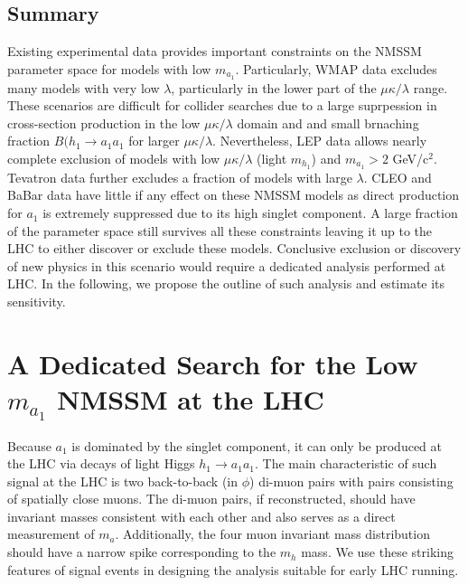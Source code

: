 \documentclass[aps,prl,nofootinbib,superscriptaddress]{revtex4}
\begin{document}
\subsection{Summary}
Existing experimental data provides important constraints on the NMSSM parameter space for models with low $m_{a_1}$. 
Particularly, WMAP data excludes many models with very low $\lambda$, particularly in the lower part of the $\mu\kappa/\lambda$
range. These scenarios are difficult for collider searches due to a large suprpession in cross-section production in
the low $\mu\kappa/\lambda$ domain and and small brnaching fraction $B(h_1 \to a_1 a_1$ for larger $\mu\kappa/\lambda$. 
Nevertheless, LEP data allows nearly complete exclusion of models with low $\mu \kappa / \lambda$ (light $m_{h_1}$) and 
$m_{a_1}>2$ GeV/c$^2$. Tevatron data further excludes a fraction of models with large $\lambda$. CLEO and BaBar data have
little if any effect on these NMSSM models as direct production for $a_1$ is extremely suppressed due to its high singlet
component. A large fraction of the parameter space still survives all these constraints leaving it up to the LHC to
either discover or exclude these models. Conclusive exclusion or discovery of new physics in this scenario would require 
a dedicated analysis performed at LHC. In the following, we propose the outline of such analysis and estimate its 
sensitivity.

\section{A Dedicated Search for the Low $m_{a_1}$ NMSSM at the LHC}

Because $a_1$ is dominated by the singlet component, it can only be produced at the LHC via decays of light Higgs 
$h_1 \to a_1 a_1$. The main characteristic of such signal at the LHC is two back-to-back (in $\phi$) di-muon pairs 
with pairs consisting of spatially close muons. The di-muon pairs, if reconstructed, should have invariant masses 
consistent with each other and also serves as a direct measurement of $m_a$. Additionally, the four muon invariant mass 
distribution should have a narrow spike corresponding to the $m_h$ mass. We use these striking features of signal 
events in designing the analysis suitable for early LHC running.
\end{document}
